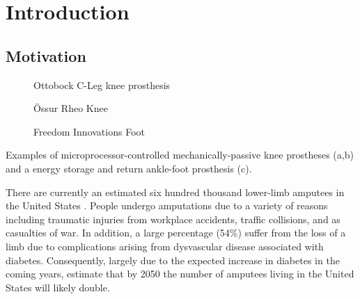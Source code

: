 \chapter{Introduction}

\section{Motivation}
\begin{marginfigure}[0.8in]
    \centering
	\begin{subfigure}[b]{\textwidth}
    	\centering
        \caption{Ottobock C-Leg knee prosthesis}
        \label{fig:ottobock_cleg}
        \vspace{0.25in}
	\end{subfigure}
	\begin{subfigure}[b]{\textwidth}
    	\centering
        \caption{Össur Rheo Knee}
        \label{fig:ossur_rheo}
        \vspace{0.25in}
	\end{subfigure}
	\begin{subfigure}[b]{\textwidth}
    	\centering
        \caption{Freedom Innovations Foot}
        \label{fig:freedom_innovations_foot}
	\end{subfigure}
    \caption{Examples of microprocessor-controlled mechanically-passive knee
    prostheses (a,b) and a energy storage and return ankle-foot prosthesis (c).}
\end{marginfigure}
There are currently an estimated six hundred thousand lower-limb amputees in the
United States \citep{ziegler2008estimating}. People undergo amputations due to a
variety of reasons including traumatic injuries from workplace accidents,
traffic collisions, and as casualties of war. In addition, a large percentage
(54\%) suffer from the loss of a limb due to complications arising from
dysvascular disease associated with diabetes.  Consequently, largely due to the
expected increase in diabetes in the coming years,
\citet{ziegler2008estimating} estimate that by 2050 the number of amputees
living in the United States will likely double.

